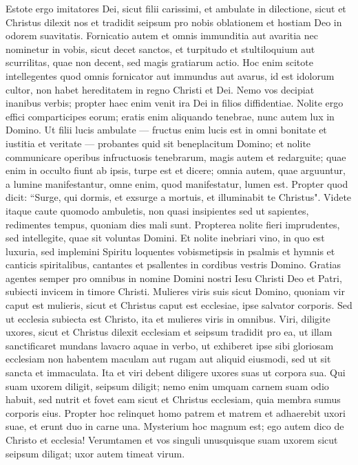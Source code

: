 \begin{biblechapter}  
\verse Estote ergo imitatores Dei, sicut filii carissimi, 
\verse et ambulate in dilectione, sicut et Christus dilexit nos et tradidit seipsum pro nobis oblationem et hostiam Deo in odorem suavitatis. 
\verse Fornicatio autem et omnis immunditia aut avaritia nec nominetur in vobis, sicut decet sanctos, 
\verse et turpitudo et stultiloquium aut scurrilitas, quae non decent, sed magis gratiarum actio. 
\verse Hoc enim scitote intellegentes quod omnis fornicator aut immundus aut avarus, id est idolorum cultor, non habet hereditatem in regno Christi et Dei. 
\verse Nemo vos decipiat inanibus verbis; propter haec enim venit ira Dei in filios diffidentiae. 
\verse Nolite ergo effici comparticipes eorum; 
\verse eratis enim aliquando tenebrae, nunc autem lux in Domino. Ut filii lucis ambulate 
\verse — fructus enim lucis est in omni bonitate et iustitia et veritate — 
\verse probantes quid sit beneplacitum Domino; 
\verse et nolite communicare operibus infructuosis tenebrarum, magis autem et redarguite; 
\verse quae enim in occulto fiunt ab ipsis, turpe est et dicere; 
\verse omnia autem, quae arguuntur, a lumine manifestantur, 
\verse omne enim, quod manifestatur, lumen est. Propter quod dicit: “Surge, qui dormis, et exsurge a mortuis, et illuminabit te Christus". 
\verse Videte itaque caute quomodo ambuletis, non quasi insipientes sed ut sapientes, 
\verse redimentes tempus, quoniam dies mali sunt. 
\verse Propterea nolite fieri imprudentes, sed intellegite, quae sit voluntas Domini. 
\verse Et nolite inebriari vino, in quo est luxuria, sed implemini Spiritu 
\verse loquentes vobismetipsis in psalmis et hymnis et canticis spiritalibus, cantantes et psallentes in cordibus vestris Domino. 
\verse Gratias agentes semper pro omnibus in nomine Domini nostri Iesu Christi Deo et Patri, 
\verse subiecti invicem in timore Christi. 
\verse Mulieres viris suis sicut Domino, 
\verse quoniam vir caput est mulieris, sicut et Christus caput est ecclesiae, ipse salvator corporis. 
\verse Sed ut ecclesia subiecta est Christo, ita et mulieres viris in omnibus. 
\verse Viri, diligite uxores, sicut et Christus dilexit ecclesiam et seipsum tradidit pro ea, 
\verse ut illam sanctificaret mundans lavacro aquae in verbo,  
\verse ut exhiberet ipse sibi gloriosam ecclesiam non habentem maculam aut rugam aut aliquid eiusmodi, sed ut sit sancta et immaculata. 
\verse Ita et viri debent diligere uxores suas ut corpora sua. Qui suam uxorem diligit, seipsum diligit; 
\verse nemo enim umquam carnem suam odio habuit, sed nutrit et fovet eam sicut et Christus ecclesiam, 
\verse quia membra sumus corporis eius. 
\verse Propter hoc relinquet homo patrem et matrem et adhaerebit uxori suae, et erunt duo in carne una. 
\verse Mysterium hoc magnum est; ego autem dico de Christo et ecclesia! 
\verse Verumtamen et vos singuli unusquisque suam uxorem sicut seipsum diligat; uxor autem timeat virum. 
\end{biblechapter}


